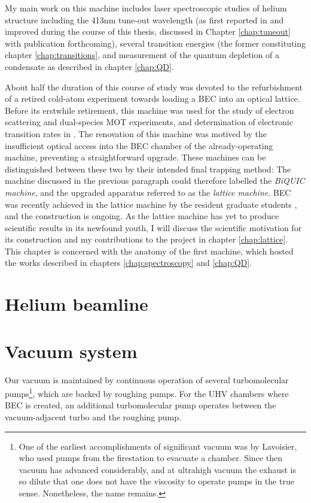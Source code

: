	My main work on this machine includes laser spectroscopic studies of helium structure including the 413nm tune-out wavelength (as first reported in \cite{Henson15} and improved during the course of this thesis, discussed in Chapter \ref{chap:tuneout} with publication forthcoming), several transition energies \cite{Ross20,Thomas20} (the former constituting chapter \ref{chap:transitions}, and measurement of the quantum depletion of a condensate as described in chapter \ref{chap:QD}.
	

	About half the duration of this course of study was devoted to the refurbishment of a retired cold-atom experiment towards loading a \mhe BEC into an optical lattice.
	Before its erstwhile retirement, this machine was used for the study of electron scattering and  dual-species MOT experiments\cite{Uhlmann05,Byron10,Byron10a}, and determination of electronic transition rates \cite{Hodgman09} in \mhe.
	The renovation of this machine was motived by the insufficient optical access into the BEC chamber of the already-operating machine, preventing a straightforward upgrade.
	These machines can be distinguished between these two by their intended final trapping method: The machine discussed in the previous paragraph could therefore labelled the \emph{BiQUIC machine}, and the upgraded apparatus referred to as the \emph{lattice machine}.
	BEC was recently achieved in the lattice machine by the resident graduate students \cite{Abbas21}, and the construction is ongoing.
	As the lattice machine has yet to produce scientific results in its newfound youth, I will discuss the scientific motivation for its construction and my contributions to the project in chapter \ref{chap:lattice}.
	This chapter is concerned with the anatomy of the first machine, which hosted the works described in chapters \ref{chap:spectroscopy} and \ref{chap:QD}.

\section{Helium beamline}
	\section{Vacuum system}


	Our vacuum is maintained by continuous operation of several turbomolecular pumps\footnote{One of the earliest accomplishments of significant vacuum was by Lavoisier, who used pumps from the firestation to evacuate a chamber.
	Since then vacuum has advanced considerably, and at ultrahigh vacuum the exhaust is so dilute that one does not have the viscosity to operate pumps in the true sense.
	Nonetheless, the name remains.}, which are backed by roughing pumps.
	For the UHV chambers where BEC is created, an additional turbomolecular pump operates between the vacuum-adjacent turbo and the roughing pump.
	
